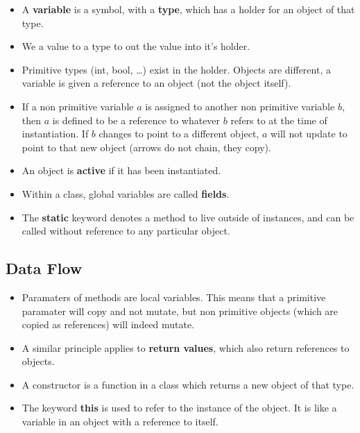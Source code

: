 \documentclass[letterpaper] {article}
\begin{document}
    \begin{itemize}
        \item A \textbf{variable} is a symbol, with a \textbf{type}, which has a holder for an object of that type. 
        \item We  a value to a type to out the value into it's holder. 
        \item Primitive types (int, bool, \dots) exist in the holder. Objects are different, a variable is given a reference to an object (not the object itself). 
        \item If a non primitive variable $a$ is assigned to another non primitive variable $b$, then $a$ is defined to be a reference to whatever $b$ refers to at the time of instantiation. If $b$ changes to point to a different object, $a$ will not update to point to that new object (arrows do not chain, they copy).
        \item An object is \textbf{active} if it has been instantiated. 
        \item Within a class, global variables are called \textbf{fields}. 
        \item The \textbf{static} keyword denotes a method to live outside of instances, and can be called without reference to any particular object. 
    \end{itemize}

    \subsection{Data Flow}
    \begin{itemize}
        \item Paramaters of methods are local variables. This means that a primitive paramater will copy and not mutate, but non primitive objects (which are copied as references) will indeed mutate.
        \item A similar principle applies to \textbf{return values}, which also return references to objects. 
        \item A constructor is a function in a class which returns a new object of that type. 
        \item The keyword \textbf{this} is used to refer to the instance of the object. It is like a variable in an object with a reference to itself. 
    \end{itemize}
\end{document}
